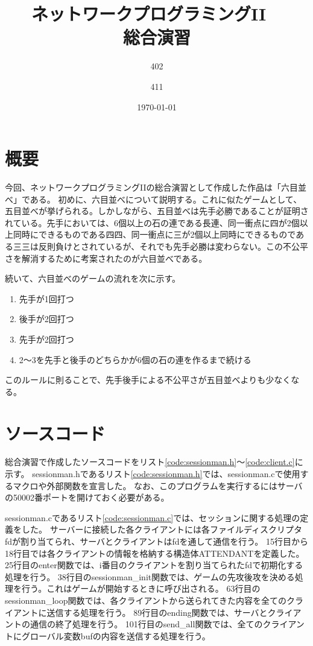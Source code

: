 \documentclass[a4j, titlepage, 10pt]{jsarticle}
\begin{document}
\title{{ \Huge ネットワークプログラミングII }~\\{ \LARGE 総合演習 }}
\author{{ \Large 402 } \and { \Large 411 }}
\date{\today}
\maketitle

\section{概要}

今回、ネットワークプログラミングIIの総合演習として作成した作品は「六目並べ」である。
初めに、六目並べについて説明する。これに似たゲームとして、五目並べが挙げられる。しかしながら、五目並べは先手必勝であることが証明されている。先手においては、6個以上の石の連である長連、同一衝点に四が2個以上同時にできるものである四四、同一衝点に三が2個以上同時にできるものである三三は反則負けとされているが、それでも先手必勝は変わらない。この不公平さを解消するために考案されたのが六目並べである。

続いて、六目並べのゲームの流れを次に示す。
\begin{enumerate}
  \item 先手が1回打つ
  \item 後手が2回打つ
  \item 先手が2回打つ
  \item 2〜3を先手と後手のどちらかが6個の石の連を作るまで続ける
\end{enumerate}
このルールに則ることで、先手後手による不公平さが五目並べよりも少なくなる。

\section{ソースコード}

総合演習で作成したソースコードをリスト\ref{code:sessionman.h}～\ref{code:client.c}に示す。
sessionman.hであるリスト\ref{code:sessionman.h}では、sessionman.cで使用するマクロや外部関数を宣言した。
なお、このプログラムを実行するにはサーバの50002番ポートを開けておく必要がある。

\lstset{ numbers = left }


sessionman.cであるリスト\ref{code:sessionman.c}では、セッションに関する処理の定義をした。
サーバーに接続した各クライアントには各ファイルディスクリプタfdが割り当てられ、サーバとクライアントはfdを通して通信を行う。
15行目から18行目では各クライアントの情報を格納する構造体ATTENDANTを定義した。
25行目のenter関数では、i番目のクライアントを割り当てられたfdで初期化する処理を行う。
38行目のsessionman\_init関数では、ゲームの先攻後攻を決める処理を行う。これはゲームが開始するときに呼び出される。
63行目のsessionman\_loop関数では、各クライアントから送られてきた内容を全てのクライアントに送信する処理を行う。
89行目のending関数では、サーバとクライアントの通信の終了処理を行う。
101行目のsend\_all関数では、全てのクライアントにグローバル変数bufの内容を送信する処理を行う。
\end{document}
